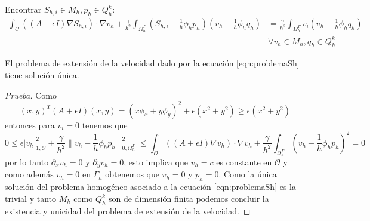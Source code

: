 Encontrar $S_{h,i} \in M_{h},p_h\in Q^k_h$:
\begin{equation}
	\begin{aligned}
		\int_\mathcal{O} ((A+\epsilon I) \nabla S_{h,i})\cdot\nabla v_h +  \frac{\gamma}{h^2}  \int_{\Omega_h^\Gamma} (S_{h,i}-\frac{1}{h}\phi_h p_{h}) (v_{h}-\frac{1}{h}\phi_h q_{h})&=
		\frac{\gamma}{h^2}  \int_{\Omega_h^\Gamma} v_i(v_{h}-\frac{1}{h}\phi_h q_{h})\\
		&\forall v_{h} \in M_{h},q_h\in Q^k_h
	\end{aligned}
	\label{eqn:problemaSh}
\end{equation}
\begin{prop}
	El problema de extensión de la velocidad dado por la ecuación \ref{eqn:problemaSh} tiene solución única.	
	\label{prop:extension}
\end{prop}
\begin{proof}[Prueba]
	Como
	\[
	(x,y)^T(A+\epsilon I)(x,y)=(x\phi_x+y\phi_y)^2+\epsilon(x^2+y^2)
	\geqslant \epsilon(x^2+y^2)
	\]
	entonces para $v_i=0$ tenemos que
	\[
	0\leqslant 	\epsilon|v_h|^2_{1,\mathcal{O}} +  
	\frac{\gamma}{h^2} \|v_{h}-\frac{1}{h}\phi_h p_{h}\|^2_{0,\Omega_h^\Gamma}  
	\leqslant 	\int_\mathcal{O} ((A+\epsilon I) \nabla v_{h})\cdot\nabla v_h+
	\frac{\gamma}{h^2}  \int_{\Omega_h^\Gamma}  (v_{h}-\frac{1}{h}\phi_h p_{h})^2 =0
	\]
	por lo tanto $\partial_x v_h=0$ y $\partial_y v_h=0$, esto implica que $v_h=c$ es constante en $\mathcal{O}$ y como además $v_h=0$ en $\Gamma_h$  obtenemos que $v_h=0$ y $p_h=0$. Como la única solución del problema homogéneo asociado a la ecuación \ref{eqn:problemaSh} es la trivial y tanto $M_{h}$ como $Q^k_h$ son de dimensión finita podemos concluir la existencia y unicidad del problema de extensión de la velocidad.
\end{proof}
